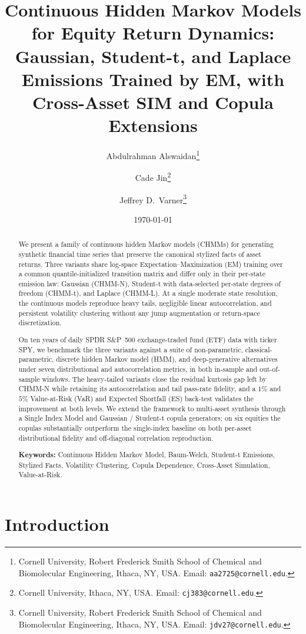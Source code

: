 \documentclass[11pt,a4paper]{article}
\title{Continuous Hidden Markov Models for Equity Return Dynamics:\\Gaussian, Student-t, and Laplace Emissions Trained by EM, with Cross-Asset SIM and Copula Extensions}
\author{
    Abdulrahman Alswaidan\thanks{Cornell University, Robert Frederick Smith School of Chemical and Biomolecular Engineering, Ithaca, NY, USA. Email: \texttt{aa2725@cornell.edu}.}
    \and
    Cade Jin\thanks{Cornell University, Ithaca, NY, USA. Email: \texttt{cj383@cornell.edu}.}
    \and
    Jeffrey D.\ Varner\thanks{Cornell University, Robert Frederick Smith School of Chemical and Biomolecular Engineering, Ithaca, NY, USA. Email: \texttt{jdv27@cornell.edu}.}
}
\date{\today}
\begin{document}
\maketitle

\begin{abstract}
We present a family of continuous hidden Markov models (CHMMs) for generating synthetic financial time series that preserve the canonical stylized facts of asset returns.
Three variants share log-space Expectation--Maximization (EM) training over a common quantile-initialized transition matrix and differ only in their per-state emission law: Gaussian (CHMM-N), Student-t with data-selected per-state degrees of freedom (CHMM-t), and Laplace (CHMM-L).
At a single moderate state resolution, the continuous models reproduce heavy tails, negligible linear autocorrelation, and persistent volatility clustering without any jump augmentation or return-space discretization.

On ten years of daily SPDR S\&P~500 exchange-traded fund (ETF) data with ticker SPY, we benchmark the three variants against a suite of non-parametric, classical-parametric, discrete hidden Markov model (HMM), and deep-generative alternatives under seven distributional and autocorrelation metrics, in both in-sample and out-of-sample windows.
The heavy-tailed variants close the residual kurtosis gap left by CHMM-N while retaining its autocorrelation and tail pass-rate fidelity, and a $1\%$ and $5\%$ Value-at-Risk (VaR) and Expected Shortfall (ES) back-test validates the improvement at both levels.
We extend the framework to multi-asset synthesis through a Single Index Model and Gaussian / Student-t copula generators; on six equities the copulas substantially outperform the single-index baseline on both per-asset distributional fidelity and off-diagonal correlation reproduction.

\bigskip\noindent
\textbf{Keywords:} Continuous Hidden Markov Model, Baum-Welch, Student-t Emissions, Stylized Facts, Volatility Clustering, Copula Dependence, Cross-Asset Simulation, Value-at-Risk.
\end{abstract}

\section{Introduction}
\label{sec:introduction}

\end{document}
